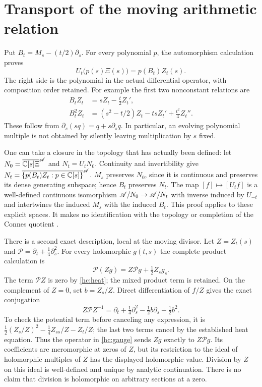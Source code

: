 \section{Transport of the moving arithmetic relation}
Put $B_t=M_s-(t/2)\partial_s$. For every polynomial $p$,
the automorphism calculation proves
\begin{equation}
U_t\bigl(p(s)\Xi(s)\bigr)=p(B_t)Z_t(s).
\label{hc:relation}
\end{equation}
The right side is the polynomial in the actual differential operator,
with composition order retained. For example the first two nonconstant
relations are
\begin{align*}
B_tZ_t&=sZ_t-\tfrac t2Z_t',\\
B_t^2Z_t&=(s^2-t/2)Z_t-tsZ_t'+\tfrac{t^2}4Z_t''.
\end{align*}
These follow from $\partial_s(sq)=q+s\partial_s q$.
In particular, an evolving polynomial multiple is not obtained by
silently leaving multiplication by $s$ fixed.

One can take a closure in the topology that has actually been defined:
let $N_0=\overline{\mathbb C[s]\Xi}^{\mathscr A}$ and $N_t=U_tN_0$.
Continuity and invertibility give
$N_t=\overline{\{p(B_t)Z_t:p\in\mathbb C[s]\}}^{\mathscr A}$.
$M_s$ preserves $N_0$, since it is continuous and preserves its dense
generating subspace; hence $B_t$ preserves $N_t$.
The map $[f]\mapsto[U_tf]$ is a well-defined continuous isomorphism
$\mathscr A/N_0\to\mathscr A/N_t$ with inverse induced by $U_{-t}$ and intertwines
the induced $M_s$ with the induced $B_t$.
This proof applies to these explicit spaces. It makes no identification
with the topology or completion of the Connes quotient
\cite[Section 3.6]{ccmProlate2024}.

There is a second exact description, local at the moving divisor.
Let $Z=Z_t(s)$ and $\mathcal P=\partial_t+\tfrac14\partial_s^2$.
For every holomorphic $g(t,s)$ the complete product calculation is
\begin{equation}
\mathcal P(Zg)=Z\mathcal Pg+\tfrac12Z_sg_s. \label{hc:ideal-defect}
\end{equation}
The term $\mathcal PZ$ is zero by \eqref{hc:heat}; the mixed product
term is retained. On the complement of $Z=0$, set $b=Z_s/Z$.
Direct differentiation of $f/Z$ gives the exact conjugation
\begin{equation}
Z\mathcal P Z^{-1}
=\partial_t+\tfrac14\partial_s^2-\tfrac12 b\partial_s+\tfrac12 b^2.
\label{hc:gauge}
\end{equation}
To check the potential term before canceling any expression, it is
$\tfrac12(Z_s/Z)^2-\tfrac14Z_{ss}/Z-Z_t/Z$;
the last two terms cancel by the established heat equation.
Thus the operator in \eqref{hc:gauge} sends $Zg$ exactly to
$Z\mathcal Pg$. Its coefficients are meromorphic at zeros of $Z$,
but its restriction to the ideal of holomorphic multiples of $Z$
has the displayed holomorphic value. Division by $Z$ on this ideal
is well-defined and unique by analytic continuation. There is no
claim that division is holomorphic on arbitrary sections at a zero.

